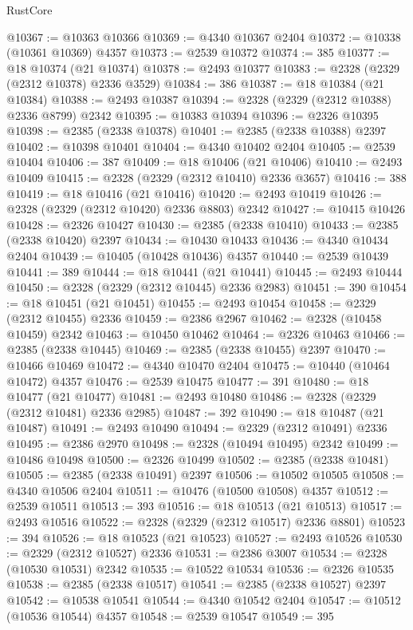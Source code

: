 \begin{lexlean}{RustCore}
\begin{coremodule}
@10367 := @10363 @10366
@10369 := @4340 @10367 @2404
@10372 := @10338 (@10361 @10369) @4357
@10373 := @2539 @10372
@10374 := 385
@10377 := @18 @10374 (@21 @10374)
@10378 := @2493 @10377
@10383 := @2328 (@2329 (@2312 @10378) @2336 @3529)
@10384 := 386
@10387 := @18 @10384 (@21 @10384)
@10388 := @2493 @10387
@10394 := @2328 (@2329 (@2312 @10388) @2336 @8799) @2342
@10395 := @10383 @10394
@10396 := @2326 @10395
@10398 := @2385 (@2338 @10378)
@10401 := @2385 (@2338 @10388) @2397
@10402 := @10398 @10401
@10404 := @4340 @10402 @2404
@10405 := @2539 @10404
@10406 := 387
@10409 := @18 @10406 (@21 @10406)
@10410 := @2493 @10409
@10415 := @2328 (@2329 (@2312 @10410) @2336 @3657)
@10416 := 388
@10419 := @18 @10416 (@21 @10416)
@10420 := @2493 @10419
@10426 := @2328 (@2329 (@2312 @10420) @2336 @8803) @2342
@10427 := @10415 @10426
@10428 := @2326 @10427
@10430 := @2385 (@2338 @10410)
@10433 := @2385 (@2338 @10420) @2397
@10434 := @10430 @10433
@10436 := @4340 @10434 @2404
@10439 := @10405 (@10428 @10436) @4357
@10440 := @2539 @10439
@10441 := 389
@10444 := @18 @10441 (@21 @10441)
@10445 := @2493 @10444
@10450 := @2328 (@2329 (@2312 @10445) @2336 @2983)
@10451 := 390
@10454 := @18 @10451 (@21 @10451)
@10455 := @2493 @10454
@10458 := @2329 (@2312 @10455) @2336
@10459 := @2386 @2967
@10462 := @2328 (@10458 @10459) @2342
@10463 := @10450 @10462
@10464 := @2326 @10463
@10466 := @2385 (@2338 @10445)
@10469 := @2385 (@2338 @10455) @2397
@10470 := @10466 @10469
@10472 := @4340 @10470 @2404
@10475 := @10440 (@10464 @10472) @4357
@10476 := @2539 @10475
@10477 := 391
@10480 := @18 @10477 (@21 @10477)
@10481 := @2493 @10480
@10486 := @2328 (@2329 (@2312 @10481) @2336 @2985)
@10487 := 392
@10490 := @18 @10487 (@21 @10487)
@10491 := @2493 @10490
@10494 := @2329 (@2312 @10491) @2336
@10495 := @2386 @2970
@10498 := @2328 (@10494 @10495) @2342
@10499 := @10486 @10498
@10500 := @2326 @10499
@10502 := @2385 (@2338 @10481)
@10505 := @2385 (@2338 @10491) @2397
@10506 := @10502 @10505
@10508 := @4340 @10506 @2404
@10511 := @10476 (@10500 @10508) @4357
@10512 := @2539 @10511
@10513 := 393
@10516 := @18 @10513 (@21 @10513)
@10517 := @2493 @10516
@10522 := @2328 (@2329 (@2312 @10517) @2336 @8801)
@10523 := 394
@10526 := @18 @10523 (@21 @10523)
@10527 := @2493 @10526
@10530 := @2329 (@2312 @10527) @2336
@10531 := @2386 @3007
@10534 := @2328 (@10530 @10531) @2342
@10535 := @10522 @10534
@10536 := @2326 @10535
@10538 := @2385 (@2338 @10517)
@10541 := @2385 (@2338 @10527) @2397
@10542 := @10538 @10541
@10544 := @4340 @10542 @2404
@10547 := @10512 (@10536 @10544) @4357
@10548 := @2539 @10547
@10549 := 395

\end{coremodule}
\end{lexlean}
